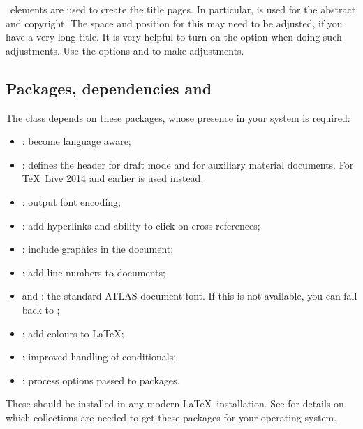 \KOMAScript\ elements are used to create the title pages.
In particular,  is used for the abstract and copyright.
The space and position for this may need to be adjusted,
if you have a very long title. 
It is very helpful to turn on the  option when doing such adjustments.
 Use the options
 and  to make adjustments.


\subsection{Packages, dependencies and }
\label{sec:atlaspackage}

The  class depends on these packages, whose presence in
your system is required:
\begin{itemize}\setlength{\parskip}{0pt}\setlength{\itemsep}{0pt}
\item {}: become language aware;
\item {}: defines the header for draft mode
  and for auxiliary material documents.
  For \TeX\ Live 2014 and earlier  is used instead.
\item {}: output font encoding;
\item {}: add hyperlinks and ability to click on cross-references;
\item {}: include graphics in the document;
\item {}: add line numbers to documents;
\item {} and : the standard ATLAS document font.
  If this is not available, you can fall back to ;
\item {}: add colours to \LaTeX;
\item {}: improved handling of conditionals;
\item {}: process options passed to packages.
\end{itemize}
These should be installed in any modern \LaTeX\ installation.
See \cite{latex-faq} for details on which collections are needed to get these packages
for your operating system.

